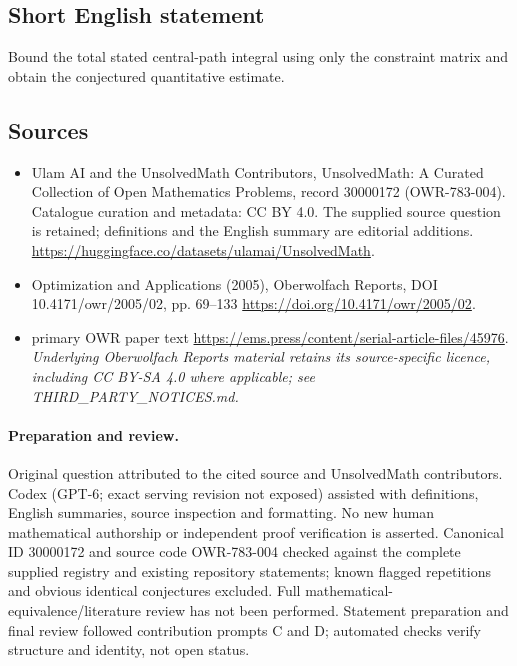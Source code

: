 \documentclass[11pt]{article}
\begin{document}
\subsection{Short English statement}
Bound the total stated central-path integral using only the constraint matrix and obtain the conjectured quantitative estimate.
\subsection{Sources}
\begin{itemize}
\item[\hypertarget{source:30000172:1}{S1}] Ulam AI and the UnsolvedMath Contributors, UnsolvedMath: A Curated Collection of Open Mathematics Problems, record 30000172 (OWR-783-004). Catalogue curation and metadata: CC BY 4.0. The supplied source question is retained; definitions and the English summary are editorial additions.
\url{https://huggingface.co/datasets/ulamai/UnsolvedMath}.
\item[\hypertarget{source:30000172:2}{S2}] Optimization and Applications (2005), Oberwolfach Reports, DOI 10.4171/owr/2005/02, pp. 69--133
\url{https://doi.org/10.4171/owr/2005/02}.
\item[\hypertarget{source:30000172:3}{S3}] primary OWR paper text
\url{https://ems.press/content/serial-article-files/45976}.
\textit{Underlying Oberwolfach Reports material retains its source-specific licence, including CC BY-SA 4.0 where applicable; see THIRD\_PARTY\_NOTICES.md.}
\end{itemize}
\paragraph{Preparation and review.}
Original question attributed to the cited source and UnsolvedMath contributors. Codex (GPT-6; exact serving revision not exposed) assisted with definitions, English summaries, source inspection and formatting. No new human mathematical authorship or independent proof verification is asserted. Canonical ID 30000172 and source code OWR-783-004 checked against the complete supplied registry and existing repository statements; known flagged repetitions and obvious identical conjectures excluded. Full mathematical-equivalence/literature review has not been performed. Statement preparation and final review followed contribution prompts C and D; automated checks verify structure and identity, not open status.
\label{end:30000172}
\end{document}
